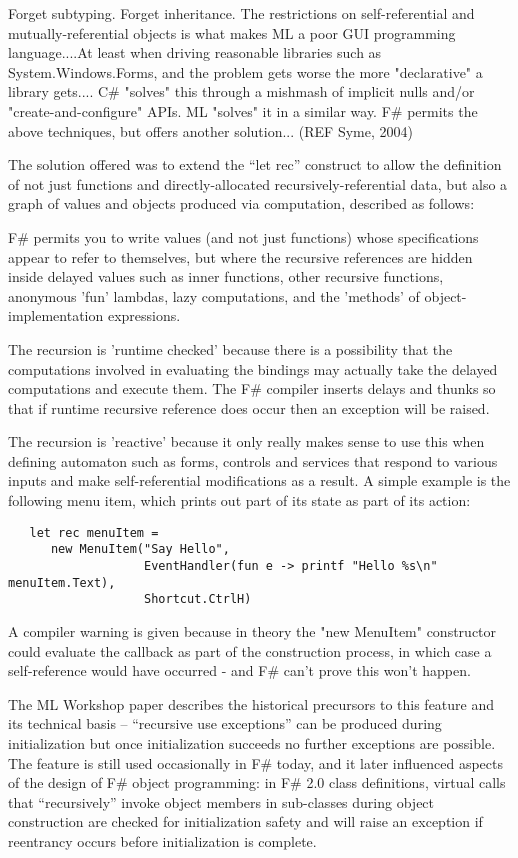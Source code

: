 \documentclass[acmsmall,review]{acmart}\settopmatter{printfolios=true,printccs=false,printacmref=false}
\begin{document}
\begin{verbquote}
Forget subtyping.  Forget inheritance.   The restrictions on self-referential and mutually-referential objects is what makes ML a poor GUI programming language....At least when driving reasonable libraries such as System.Windows.Forms, and the problem gets worse the more "declarative" a library gets.... C# "solves" this through a mishmash of implicit nulls and/or "create-and-configure" APIs.   ML "solves" it in a similar way.  F# permits the above techniques, but offers another solution... (REF Syme, 2004)
\end{verbquote}
The solution offered was to extend the “let rec” construct to allow the definition of not just functions and directly-allocated recursively-referential data, but also a graph of values and objects produced via computation, described as follows:
\begin{verbquote}
F# permits you to write values (and not just functions) whose specifications appear to refer to themselves, but where the recursive references are hidden inside delayed values such as inner functions, other recursive functions, anonymous 'fun' lambdas, lazy computations, and the 'methods' of object-implementation expressions. 

The recursion is 'runtime checked' because there is a possibility that the computations involved in evaluating the bindings may actually take the delayed computations and execute them. The F# compiler inserts delays and thunks so that if runtime recursive reference does occur then an exception will be raised.

The recursion is 'reactive' because it only really makes sense to use this when defining automaton such as forms, controls and services that respond to various inputs and make self-referential modifications as a result. A simple example is the following menu item, which prints out part of its state as part of its action:
\end{verbquote}
\begin{verbatim}
   let rec menuItem = 
      new MenuItem("Say Hello", 
                   EventHandler(fun e -> printf "Hello %s\n" menuItem.Text), 
                   Shortcut.CtrlH)
\end{verbatim}
\begin{verbquote}
A compiler warning is given because in theory the "new MenuItem" constructor could evaluate the callback as part of the construction process, in which case a self-reference would have occurred - and F# can't prove this won't happen. 
\end{verbquote}
The ML Workshop paper describes the historical precursors to this feature and its technical basis – “recursive use exceptions” can be produced during initialization but once initialization succeeds no further exceptions are possible. The feature is still used occasionally in F\# today, and it later influenced aspects of the design of F\# object programming: in F\# 2.0 class definitions, virtual calls that “recursively” invoke object members in sub-classes during object construction are checked for initialization safety and will raise an exception if reentrancy occurs before initialization is complete. 
\end{document}
